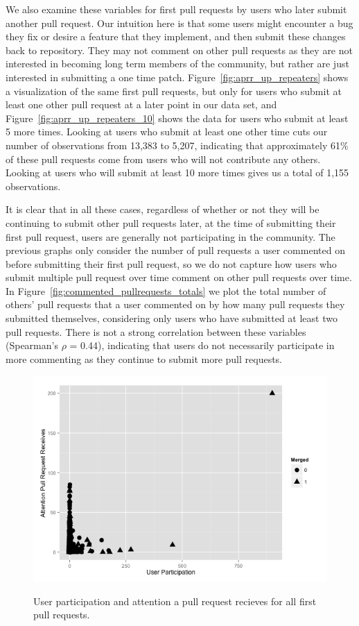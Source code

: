 \documentclass{iitthesis}
\begin{document}
We also examine these variables for first pull requests by users who later
submit another pull request. Our intuition here is that some users might
encounter a bug they fix or desire a feature that they implement, and then
submit these changes back to repository. They may not comment on other pull
requests as they are not interested in becoming long term members of the
community, but rather are just interested in submitting a one time patch.
Figure~\ref{fig:aprr_up_repeaters} shows a visualization of the same first pull
requests, but only for users who submit at least one other pull request at a
later point in our data set, and Figure~\ref{fig:aprr_up_repeaters_10} shows the
data for users who submit at least 5 more times. Looking at users who submit
at least one other time cuts our number of observations from 13,383 to 5,207,
indicating that approximately 61\% of these pull requests come from users who
will not contribute any others. Looking at users who will submit at least 10
more times gives us a total of 1,155 observations.

It is clear that in all these cases, regardless of whether or not they will be
continuing to submit other pull requests later, at the time of submitting their
first pull request, users are generally not participating in the community. The
previous graphs only consider the number of pull requests a user commented on
before submitting their first pull request, so we do not capture how users who
submit multiple pull request over time comment on other pull requests over time.
In Figure~\ref{fig:commented_pullrequests_totals} we plot the total number of
others' pull requests that a user commented on by how many pull requests they
submitted themselves, considering only users who have submitted at least two
pull requests. There is not a strong correlation between these variables
(Spearman's $\rho$  = 0.44), indicating that users do not necessarily
participate in more commenting as they continue to submit more pull requests.

\begin{figure}[p] \centering \label{fig:aprr_up}
\includegraphics[scale=0.6]{figures/aprr_up_ggplot.png} \caption{User
participation and attention a pull request recieves for all first pull
requests.} \end{figure}
\end{document}
